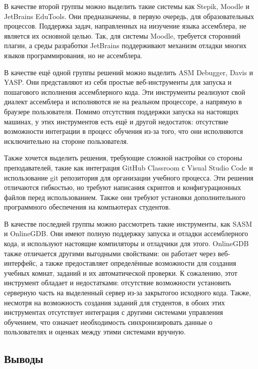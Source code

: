 \documentclass[a4paper,article,14pt]{extarticle}
\begin{document}
В качестве второй группы можно выделить такие системы как Stepik, Moodle и JetBrains EduTools. Они предназначены, в первую очередь, для образовательных процессов. Поддержка задач, направленных на иизучение языка ассемблера, не является их основной целью. Так, для системы Moodle, требуется сторонний плагин, а среды разработки JetBrains поддерживают механизм отладки многих языков программирования, но не ассемблера.

В качестве ещё одной группы решений можно выделить ASM Debugger, Davis и YASP. Они представляют из себя простые веб-инструменты для запуска и пошагового исполнения ассемблерного кода. Эти инструменты реализуют свой диалект ассемблера и исполняются не на реальном процессоре, а напрямую в браузере пользователя. Помимо отсутствия поддержки запуска на настоящих машинах, у этих инструментов есть ещё и другой недостаток: отсутствие возможности интеграции в процесс обучения из-за того, что они исполняются исключительно на стороне пользователя.

Также хочется выделить решения, требующие сложной настройки со стороны преподавателей, такие как интеграция GitHub Classroom с Visual Studio Code и использование git репозитория для организации учебного процесса. Эти решения отличаются гибкостью, но требуют написания скриптов и конфигурационных файлов перед использованием. Также они требуют установки дополнительного программного обеспечения на компьютерах студентов.

В качестве последней группы можно рассмотреть такие инструменты, как SASM и OnlineGDB. Они имеют полную поддержку запуска и отладки ассемблерного кода, и используют настоящие компиляторы и отладчики для этого. OnlineGDB также отличается другими выгодными свойствами: он работает через веб-интерфейс, а также предоставляет определённые возможности для создания учебных комнат, заданий и их автоматической проверки. К сожалению, этот инструмент обладает и недостатками: отсутствие возможности установить серверную часть на выделенный сервер из-за закрытогоо исходного кода. Также, несмотря на возможность создания заданий для студентов, в обоих этих инструментах отсутствует интеграция с другими системами управления обучением, что означает необходимость синхронизировать данные о пользователях и оценках между этими системами вручную.

\subsection{Выводы}
\end{document}
